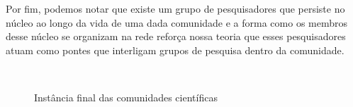 Por fim, podemos notar que existe um grupo de pesquisadores que persiste no núcleo ao longo da vida de uma dada comunidade e 
a forma como os membros desse núcleo se organizam na rede reforça nossa teoria que esses pesquisadores atuam como pontes 
que interligam grupos de pesquisa dentro da comunidade.


\begin{figure}[!htb]
  \begin{center}
  \\
  \end{center}
  \caption{Instância final das comunidades científicas}
  \label{fig:redes}
\end{figure}
